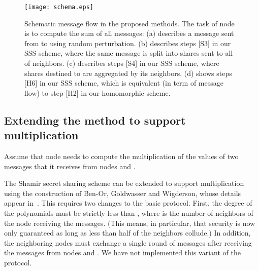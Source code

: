 \documentclass[times, 10pt,twocolumn]{article}
\begin{document}

\begin{figure}
\texttt{[image: schema.eps]}\\
  \caption{Schematic message flow in the proposed methods. The task of node  is to compute the sum of all messages:  (a) describes a message sent from  to  using random perturbation.
  (b) describes steps [S3] in our SSS scheme, where the same message  is split into shares sent to all of  neighbors.
  (c) describes steps [S4] in our SSS scheme, where shares destined to  are aggregated by its neighbors. (d) shows steps [H6] in our SSS scheme,
    which is equivalent (in term of message flow) to step [H2] in our homomorphic scheme. }\label{dimes}
\end{figure}

\subsection{Extending the method to support multiplication}

Assume  that node  needs to compute the multiplication of the
values of  two messages that it receives from nodes  and .
 The Shamir secret sharing scheme
can be extended to support multiplication using the construction
of Ben-Or, Goldwasser and Wigderson, whose details appear
in~\cite{BGW}. This requires two changes to the basic protocol.
First, the degree of the polynomials must be strictly less than
, where  is the number of neighbors of the node receiving
the messages. (This means, in particular, that security is now
only guaranteed as long as less than half of the neighbors
collude.) In addition, the neighboring nodes must exchange a
single round of messages after receiving the messages from nodes
 and .
We have not implemented this variant of the protocol.
\end{document}
